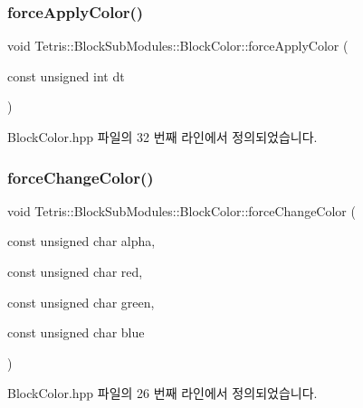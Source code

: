 \subsubsection{\texorpdfstring{force\+Apply\+Color()}{forceApplyColor()}}
{\footnotesize\ttfamily void Tetris\+::\+Block\+Sub\+Modules\+::\+Block\+Color\+::force\+Apply\+Color (\begin{DoxyParamCaption}\item[{const unsigned int}]{dt }\end{DoxyParamCaption})\hspace{0.3cm}{\ttfamily [inline]}}



Block\+Color.\+hpp 파일의 32 번째 라인에서 정의되었습니다.

\mbox{\label{class_tetris_1_1_block_sub_modules_1_1_block_color_ae6d640629b11d880ca994923657adbe1}} 
\subsubsection{\texorpdfstring{force\+Change\+Color()}{forceChangeColor()}}
{\footnotesize\ttfamily void Tetris\+::\+Block\+Sub\+Modules\+::\+Block\+Color\+::force\+Change\+Color (\begin{DoxyParamCaption}\item[{const unsigned char}]{alpha,  }\item[{const unsigned char}]{red,  }\item[{const unsigned char}]{green,  }\item[{const unsigned char}]{blue }\end{DoxyParamCaption})\hspace{0.3cm}{\ttfamily [inline]}}



Block\+Color.\+hpp 파일의 26 번째 라인에서 정의되었습니다.

